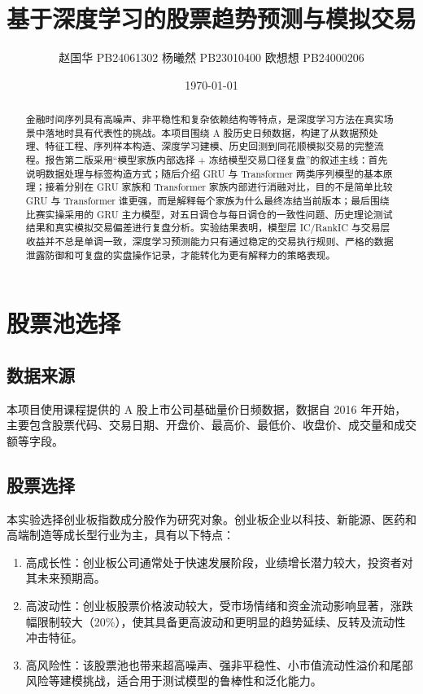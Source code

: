 \documentclass[12pt,a4paper,cn,bibtex]{elegantpaper}
\title{基于深度学习的股票趋势预测与模拟交易}
\author{赵国华 PB24061302 \quad 杨曦然 PB23010400 \quad 欧想想 PB24000206}
\institute{中国科学技术大学\\深度学习基础大作业报告}
\date{\today}
\begin{document}
\maketitle

\begin{abstract}
金融时间序列具有高噪声、非平稳性和复杂依赖结构等特点，是深度学习方法在真实场景中落地时具有代表性的挑战。本项目围绕 A 股历史日频数据，构建了从数据预处理、特征工程、序列样本构造、深度学习建模、历史回测到同花顺模拟交易的完整流程。报告第二版采用“模型家族内部选择 + 冻结模型交易口径复盘”的叙述主线：首先说明数据处理与标签构造方式；随后介绍 GRU 与 Transformer 两类序列模型的基本原理；接着分别在 GRU 家族和 Transformer 家族内部进行消融对比，目的不是简单比较 GRU 与 Transformer 谁更强，而是解释每个家族为什么最终冻结当前版本；最后围绕比赛实操采用的 GRU 主力模型，对五日调仓与每日调仓的一致性问题、历史理论测试结果和真实模拟交易偏差进行复盘分析。实验结果表明，模型层 IC/RankIC 与交易层收益并不总是单调一致，深度学习预测能力只有通过稳定的交易执行规则、严格的数据泄露防御和可复盘的实盘操作记录，才能转化为更有解释力的策略表现。
\end{abstract}

\tableofcontents
\newpage

\section{股票池选择}

\subsection{数据来源}

本项目使用课程提供的 A 股上市公司基础量价日频数据，数据自 2016 年开始，主要包含股票代码、交易日期、开盘价、最高价、最低价、收盘价、成交量和成交额等字段。

\subsection{股票选择}
本实验选择创业板指数成分股作为研究对象。创业板企业以科技、新能源、医药和高端制造等成长型行业为主，具有以下特点：
\begin{enumerate}
    \item 高成长性：创业板公司通常处于快速发展阶段，业绩增长潜力较大，投资者对其未来预期高。
    \item 高波动性：创业板股票价格波动较大，受市场情绪和资金流动影响显著，涨跌幅限制较大（20\%），使其具备更高波动和更明显的趋势延续、反转及流动性冲击特征。
    \item 高风险性：该股票池也带来超高噪声、强非平稳性、小市值流动性溢价和尾部风险等建模挑战，适合用于测试模型的鲁棒性和泛化能力。
\end{enumerate}
\end{document}
